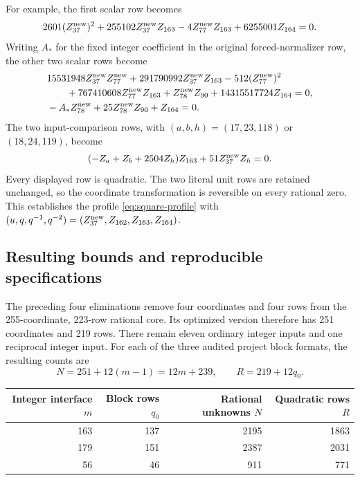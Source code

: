\documentclass[11pt]{article}
\begin{document}
For example, the first scalar row becomes
\[
 2601(Z_{37}^{\rm new})^2
 +255102Z_{37}^{\rm new}Z_{163}
 -4Z_{77}^{\rm new}Z_{163}+6255001Z_{164}=0.
\]
Writing \(A_*\) for the fixed integer coefficient in the original
forced-normalizer row, the other two scalar rows become
\begin{align*}
 &15531948Z_{37}^{\rm new}Z_{77}^{\rm new}
 +291790992Z_{37}^{\rm new}Z_{163}
 -512(Z_{77}^{\rm new})^2\\
 &\qquad+767410608Z_{77}^{\rm new}Z_{163}
 +Z_{78}^{\rm new}Z_{90}+14315517724Z_{164}=0,\\
 &-A_*Z_{78}^{\rm new}+25Z_{78}^{\rm new}Z_{90}+Z_{164}=0.
\end{align*}
The two input-comparison rows, with \((a,b,h)=(17,23,118)\) or
\((18,24,119)\), become
\[
              (-Z_a+Z_b+2504Z_h)Z_{163}
                   +51Z_{37}^{\rm new}Z_h=0.
\]
Every displayed row is quadratic. The two literal unit rows are retained
unchanged, so the coordinate transformation is reversible on every rational
zero. This establishes the profile \eqref{eq:square-profile} with
\((u,q,q^{-1},q^{-2})=(Z_{37}^{\rm new},Z_{162},Z_{163},Z_{164})\).

\subsection{Resulting bounds and reproducible specifications}
The preceding four eliminations remove four coordinates and four rows from
the 255-coordinate, 223-row rational core. Its optimized version therefore
has 251 coordinates and 219 rows. There remain eleven ordinary integer
inputs and one reciprocal integer input. For each of the three audited
project block formats, the resulting counts are
\begin{equation}\label{eq:combined-count}
 \boxed{\quad N=251+12(m-1)=12m+239,\qquad
                R=219+12q_0.\quad}
\end{equation}

\begin{center}
\begin{tabular}{rrrr}
\toprule
Integer interface \(m\)&Block rows \(q_0\)&Rational unknowns \(N\)&Quadratic rows \(R\)\\
\midrule
163&137&2195&1863\\
179&151&2387&2031\\
56&46&911&771\\
\bottomrule
\end{tabular}
\end{center}
\end{document}
